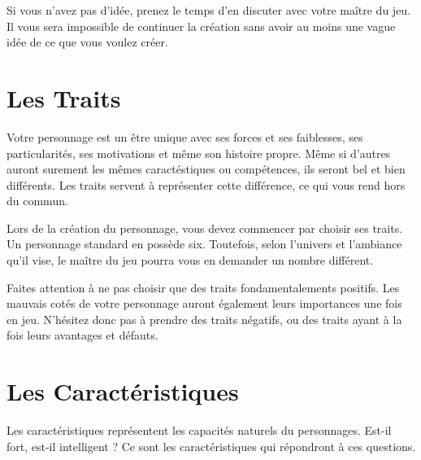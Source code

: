 Si vous n'avez pas d'idée, prenez le temps d'en discuter avec votre maître du jeu. Il vous sera impossible de continuer la création sans avoir au moins une vague idée de ce que vous voulez créer.

\section{Les Traits}

Votre personnage est un être unique avec ses forces et ses faiblesses, ses particularités, ses motivations et même son histoire propre. Même si d'autres auront surement les mêmes caractéstiques ou compétences, ils seront bel et bien différents. Les traits servent à représenter cette différence, ce qui vous rend hors du commun.

Lors de la création du personnage, vous devez commencer par choisir ses traits. Un personnage standard en possède six. Toutefois, selon l'univers et l'ambiance qu'il vise, le maître du jeu pourra vous en demander un nombre différent.


Faites attention à ne pas choisir que des traits fondamentalements positifs. Les mauvais cotés de votre personnage auront également leurs importances une fois en jeu. N'hésitez donc pas à prendre des traits négatifs, ou des traits ayant à la fois leurs avantages et défauts.

\section{Les Caractéristiques}

Les caractéristiques représentent les capacités naturels du personnages. Est-il fort, est-il intelligent ? Ce sont les caractéristiques qui répondront à ces questions.

